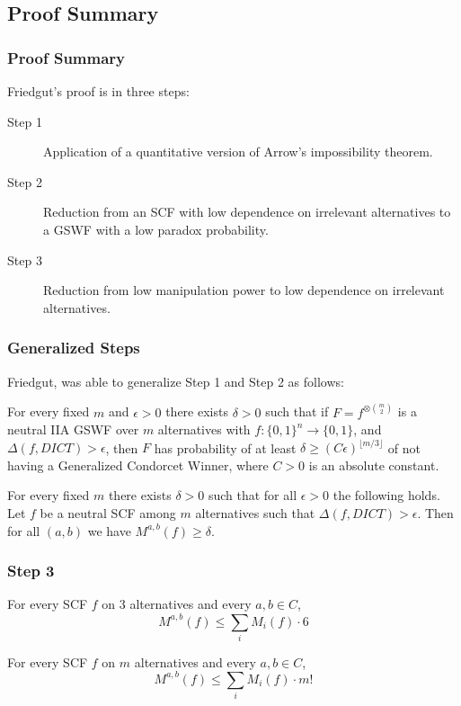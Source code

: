 \documentclass[aspectratio=169]{beamer}
\begin{document}
	\subsection{Proof Summary}

		\begin{frame}
			\frametitle{Proof Summary}

			Friedgut's proof is in three steps:

			\begin{description}
				\item[Step 1] Application of a quantitative version of Arrow's impossibility theorem.
				\item[Step 2] Reduction from an SCF with low dependence on irrelevant alternatives to a GSWF with a low paradox probability.
				\item[Step 3] Reduction from low manipulation power to low dependence on irrelevant alternatives.
			\end{description}
		\end{frame}

		\begin{frame}
			\frametitle{Generalized Steps}

			Friedgut, was able to generalize Step 1 and Step 2 as follows:

			\begin{lemma}
				For every fixed $m$ and $\epsilon > 0$ there exists $\delta > 0$ such that if $F = f^{\otimes \binom{m}{2}}$ is a neutral IIA GSWF over $m$ alternatives with $f : \{0,1\}^n \rightarrow \{0,1\}$, and $\Delta(f, DICT) > \epsilon$, then $F$ has probability of at least $\delta \ge (C\epsilon)^{\lfloor m/3 \rfloor}$ of not having a Generalized Condorcet Winner, where $C > 0$ is an absolute constant.
			\end{lemma}

			\begin{lemma}
				For every fixed $m$ there exists $\delta > 0$ such that for all $\epsilon > 0$ the following holds. Let $f$ be a neutral SCF among $m$ alternatives such that $\Delta(f, DICT) > \epsilon$. Then for all $(a,b)$ we have $M^{a,b}(f) \ge \delta$.
			\end{lemma}

		\end{frame}

		\begin{frame}
			\frametitle{Step 3}

			\begin{lemma}
				For every SCF $f$ on $3$ alternatives and every $a,b \in C$,
				\[
					M^{a,b}(f) \le \sum_i M_i(f) \cdot 6
				\]
			\end{lemma}

			\begin{lemma}
				For every SCF $f$ on $m$ alternatives and every $a,b \in C$,
				\[
					M^{a,b}(f) \le \sum_i M_i(f) \cdot m!
				\]
			\end{lemma}
		\end{frame}
\end{document}
